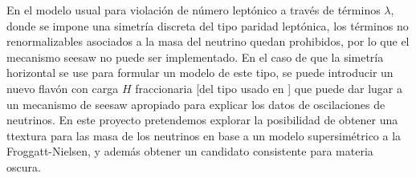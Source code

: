 \begin{ideas}

En el modelo usual para violación de número leptónico a través de términos $\lambda$, donde se impone una simetría discreta del tipo paridad leptónica, los términos no renormalizables asociados a la masa del neutrino quedan prohibidos, por lo que el mecanismo seesaw no puede ser implementado. En el caso de que la simetría horizontal se use para formular un modelo de este tipo, se puede introducir un nuevo flavón con carga $H$ fraccionaria [del tipo usado en \cite{Chen:2008tc}] que puede dar lugar a un mecanismo de seesaw apropiado para explicar los datos de oscilaciones de neutrinos. En este proyecto pretendemos explorar la posibilidad de obtener una ttextura para las masa de los neutrinos en base a un modelo supersimétrico a la Froggatt-Nielsen, y además obtener un candidato consistente para materia oscura.

\end{ideas}


